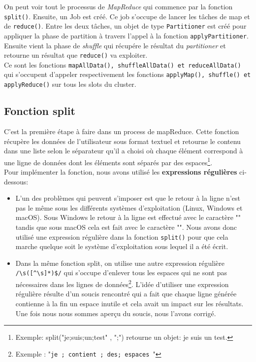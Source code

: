 On peut voir tout le processus de {\it MapReduce} qui commence par la fonction {\tt split()}. Ensuite, un Job est créé. Ce job s'occupe de lancer les tâches de map et de {\tt reduce()}. Entre les deux tâches, un objet de type {\tt Partitioner} est créé pour appliquer la phase de partition à travers l'appel à la fonction {\tt applyPartitioner}. Ensuite vient la phase de {\it shuffle} qui récupére le résultat du {\it partitioner} et retourne un résultat que {\tt reduce()} va exploiter.\\

Ce sont les fonctions {\tt mapAllData(), shuffleAllData() et reduceAllData()} qui s'occupent d'appeler respectivement les fonctions {\tt applyMap(), shuffle() et applyReduce()} sur tous les slots du cluster.

\subsection{Fonction split}

C'est la première étape à faire dans un process de mapReduce. Cette fonction récupère les données de l'utilisateur sous format textuel et retourne le contenu dans une liste selon le séparateur qu'il a choisi où chaque élément correspond à une ligne de données dont les éléments sont séparés par des espaces\footnote{Exemple: split("je;suis;un;test" , ";") retourne un objet: {je suis un test}.}.\\
Pour implémenter la fonction, nous avons utilisé les {\bf expressions régulières} ci-dessous:

\begin{itemize}
\item L'un des problèmes qui peuvent s'imposer est que le retour à la ligne n'est pas le même sous les différents systèmes d'exploitation (Linux, Windows et macOS). Sous Windows le retour à la ligne est effectué avec le caractère "" tandis que sous macOS cela est fait avec le caractère "". 	
Nous avons donc utilisé une expression régulière dans la fonction {\tt split()} pour que cela marche quelque soit le système d'exploitation sous lequel il a été écrit.\\

\item Dans la même fonction split, on utilise une autre expression régulière {\tt \verb|/\s([^\s]*)$/|} qui s'occupe d'enlever tous les espaces qui ne sont pas nécessaires dans les lignes de données\footnote{Exemple : "{\tt je    ;    contient  ; des;     espaces }"}. L'idée d'utiliser une expression régulière résulte d'un soucis rencontré qui a fait que chaque ligne générée contienne à la fin un espace inutile et cela avait un impact sur les résultats. Une fois nous nous sommes aperçu du soucis, nous l'avons corrigé.
\end{itemize}

